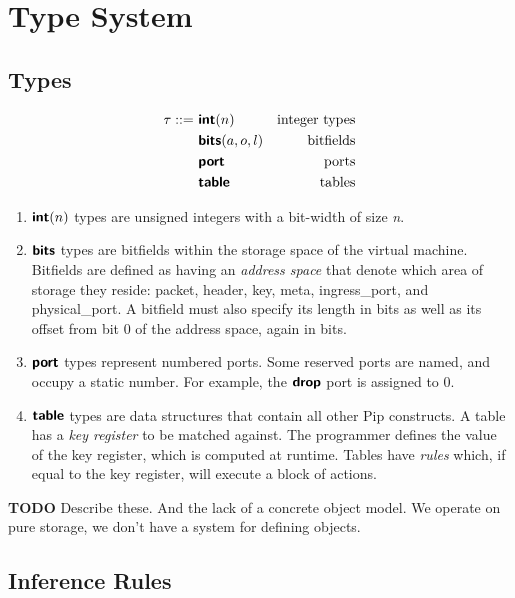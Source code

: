 
\section{Type System}

\subsection{Types}

\begin{align*}
\tau ::=~& \bm{\mathsf{{int}}}(n)        & \text{integer types} \\
         & \bm{\mathsf{{bits}}}(a, o, l) & \text{bitfields} \\
         & \bm{\mathsf{{port}}}          & \text{ports} \\
         & \bm{\mathsf{{table}}}         & \text{tables} \\
\end{align*}

\begin{enumerate}
\item $\bm{\mathsf{{int}}}(n)$ types are unsigned integers with a bit-width of size \textit{n}.
\item $\bm{\mathsf{{bits}}}$ types are bitfields within the storage space of the virtual machine. Bitfields are defined as having an \textit{address space} that denote which area of storage they reside: packet, header, key, meta, ingress\_port, and physical\_port. A bitfield must also specify its length in bits as well as its offset from bit 0 of the address space, again in bits.
\item $\bm{\mathsf{{port}}}$ types represent numbered ports. Some reserved ports are named, and occupy a static number. For example, the $\bm{\mathsf{{drop}}}$ port is assigned to 0.
\item $\bm{\mathsf{{table}}}$ types are data structures that contain all other Pip constructs. A table has a \textit{key register} to be matched against. The programmer defines the value of the key register, which is computed at runtime. Tables have \textit{rules} which, if equal to the key register, will execute a block of actions.
\end{enumerate}

\textbf{TODO} Describe these. And the lack of a concrete object model. We
operate on pure storage, we don't have a system for defining objects.

\subsection{Inference Rules}
